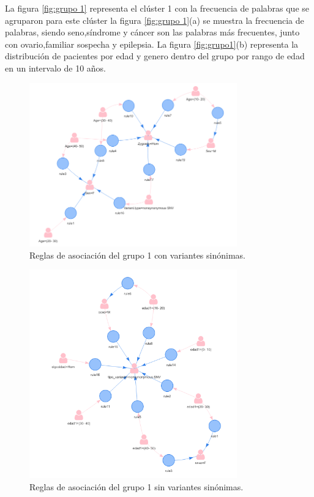La figura \ref{fig:grupo 1} representa el clúster 1 con la frecuencia de palabras que se agruparon para este clúster  la figura \ref{fig:grupo 1}(a) se muestra la frecuencia de palabras, siendo seno,síndrome y cáncer son las palabras más frecuentes, junto con ovario,familiar sospecha y epilepsia. La figura \ref{fig:grupo1}(b) representa la distribución de pacientes por edad y genero dentro del grupo por rango de edad en un intervalo de 10 años.\\

\begin{figure}[H]
	\centering
	\includegraphics[width=0.8\textwidth]{Kap4/reglas1_1}
	\caption{Reglas de asociación del grupo 1 con variantes sinónimas.} \label{fig:reglas1}
\end{figure}

\begin{figure}[H]
	\centering
	\includegraphics[width=0.8\textwidth]{Kap4/reglas1_2}
	\caption{Reglas de asociación del grupo 1 sin variantes sinónimas.} \label{fig:reglas2}
\end{figure}

